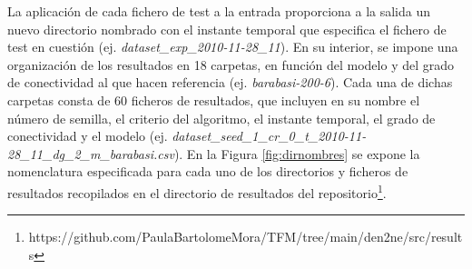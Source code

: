 \vspace{3mm}

La aplicación de cada fichero de test a la entrada proporciona a la salida un nuevo directorio nombrado con el instante temporal que especifica el fichero de test en cuestión (ej. \textit{dataset\_exp\_2010-11-28\_11}). En su interior, se impone una organización de los resultados en 18 carpetas, en función del modelo y del grado de conectividad al que hacen referencia (ej. \textit{barabasi-200-6}). Cada una de dichas carpetas consta de 60 ficheros de resultados, que incluyen en su nombre el número de semilla, el criterio del algoritmo, el instante temporal, el grado de conectividad y el modelo (ej. \textit{dataset\_seed\_1\_cr\_0\_t\_2010-11-28\_11\_dg\_2\_m\_barabasi.csv}). En la Figura \ref{fig:dirnombres} se expone la nomenclatura especificada para cada uno de los directorios y ficheros de resultados recopilados en el directorio de resultados del repositorio\footnote{https://github.com/PaulaBartolomeMora/TFM/tree/main/den2ne/src/results}.

\vspace{3mm}

